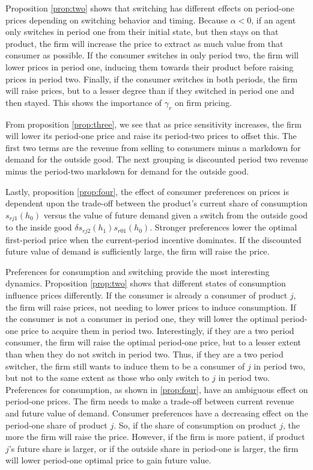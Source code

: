 \documentclass[12pt]{article}
\theoremstyle{definition}
\theoremstyle{remark}
\begin{document}
Proposition \ref{prop:two} shows that switching has different effects on
period-one prices depending on switching behavior and timing. Because
$\alpha<0$, if an agent only switches in period one from their initial state,
but then stays on that product, the firm will increase the price to extract as
much value from that consumer as possible. If the consumer switches in only
period two, the firm will lower prices in period one, inducing them towards
their product before raising prices in period two. Finally, if the consumer
switches in both periods, the firm will raise prices, but to a lesser degree
than if they switched in period one and then stayed. This shows the importance
of $\gamma_r$ on firm pricing. 

From proposition \ref{prop:three}, we see that as price sensitivity increases,
the firm will lower its period-one price and raise its period-two prices to
offset this. The first two terms are the revenue from selling to
consumers minus a markdown for demand for the outside good. The next grouping is
discounted period two revenue minus the period-two markdown for demand for the
outside good. 

Lastly, proposition \ref{prop:four}, the effect of consumer preferences on prices
is dependent upon the trade-off between the product's current share of
consumption $s_{rj1}(h_0)$ versus the value of future demand given a switch from
the outside good to the inside good $\delta s_{rj2}(h_1)s_{r01}(h_0)$. Stronger
preferences lower the optimal first-period price when the current-period
incentive dominates. If the discounted future value of demand is sufficiently
large, the firm will raise the price. 

Preferences for consumption and switching provide the most interesting dynamics.
Proposition \ref{prop:two} shows that different states of consumption influence
prices differently. If the consumer is already a consumer of product $j$, the
firm will raise prices, not needing to lower prices to induce consumption. If
the consumer is not a consumer in period one, they will lower the optimal period-one price to
acquire them in period two. Interestingly, if they are a two period consumer, the firm will raise the optimal period-one price, but to a lesser extent than when they do not switch in period two. Thus, if they are a two period switcher, the firm still wants to induce them to be a consumer of $j$ in period two, but not to the same extent as those who only switch to $j$ in period two. Preferences for consumption, as shown in \ref{prop:four}, have an ambiguous effect on period-one prices. The firm needs to make a trade-off between current revenue and future value of demand. Consumer preferences have a decreasing effect on the period-one share of product $j$. So, if the share of consumption on product $j$, the more the firm will raise the price. However, if the firm is more patient, if product $j$'s future share is larger, or if the outside share in period-one is larger, the firm will lower period-one optimal price to gain future value.
\end{document}
